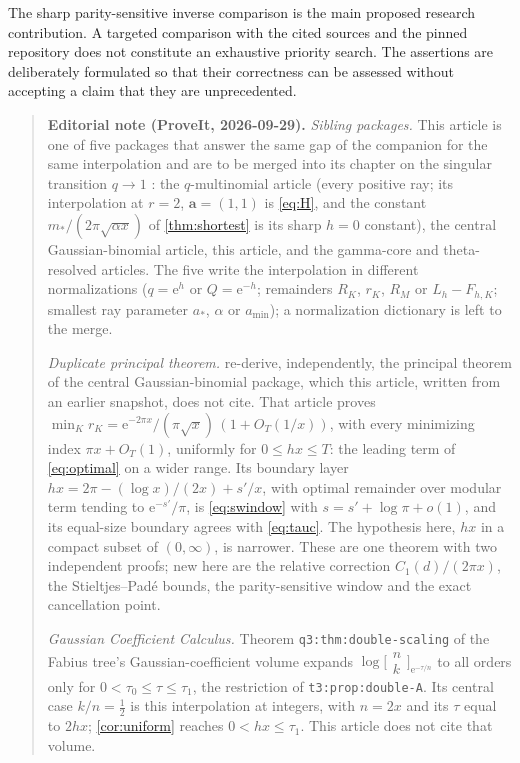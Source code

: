 \documentclass[11pt,a4paper]{article}
\newcommand{\ee}{\mathrm e}
\numberwithin{equation}{section}
\theoremstyle{plain}
\theoremstyle{definition}
\theoremstyle{remark}
\begin{document}
The sharp parity-sensitive inverse comparison is the main proposed research
contribution. A targeted comparison with the cited sources and the pinned
repository does not constitute an exhaustive priority search. The assertions
are deliberately formulated so that their correctness can be assessed without
accepting a claim that they are unprecedented.

\begin{quote}\small
\textbf{Editorial note (ProveIt, 2026-09-29).}
\emph{Sibling packages.} This article is one of five packages that answer
the same gap of the companion for the same interpolation and are to be merged
into its chapter on the singular transition $q\to1$ \cite{ed:siblings}: the
$q$-multinomial article (every positive ray; its interpolation at $r=2$,
$\boldsymbol a=(1,1)$ is \eqref{eq:H}, and the constant
$m_*/(2\pi\sqrt{\alpha x})$ of \cref{thm:shortest} is its sharp $h=0$
constant), the central Gaussian-binomial article, this article, and the
gamma-core and theta-resolved articles. The five write the interpolation in different normalizations ($q=\ee^h$ or $Q=\ee^{-h}$; remainders $R_K$, $r_K$, $R_M$ or $L_h-F_{h,K}$; smallest ray parameter $a_*$, $\alpha$ or $a_{\min}$); a normalization dictionary is left to the merge.

\emph{Duplicate principal theorem.} 
re-derive, independently, the principal theorem of the central
Gaussian-binomial package, which this article, written from an earlier
snapshot, does not cite. That article proves
$\min_Kr_K=\ee^{-2\pi x}/(\pi\sqrt x)\,(1+O_T(1/x))$, with every minimizing
index $\pi x+O_T(1)$, uniformly for $0\le hx\le T$: the leading term of
\eqref{eq:optimal} on a wider range. Its boundary layer
$hx=2\pi-(\log x)/(2x)+s'/x$, with optimal remainder over modular term
tending to $\ee^{-s'}/\pi$, is \eqref{eq:swindow} with
$s=s'+\log\pi+o(1)$, and its equal-size boundary agrees with
\eqref{eq:tauc}. The hypothesis here, $hx$ in a compact subset of
$(0,\infty)$, is narrower. These are one theorem with two independent
proofs; new here are the relative correction $C_1(d)/(2\pi x)$, the
Stieltjes--Pad\'e bounds, the parity-sensitive window and the exact
cancellation point.

\emph{Gaussian Coefficient Calculus.} Theorem \texttt{q3:thm:double-scaling}
of the Fabius tree's Gaussian-coefficient volume \cite{ed:gcc} expands
$\log\bigl[\begin{smallmatrix}n\\k\end{smallmatrix}\bigr]_{\ee^{-\tau/n}}$
to all orders only for $0<\tau_0\le\tau\le\tau_1$, the restriction of
\texttt{t3:prop:double-A}. Its central case $k/n=\frac12$ is this
interpolation at integers, with $n=2x$ and its $\tau$ equal to $2hx$;
\cref{cor:uniform} reaches $0<hx\le\tau_1$. This article does not cite that
volume.


\end{quote}
\end{document}
